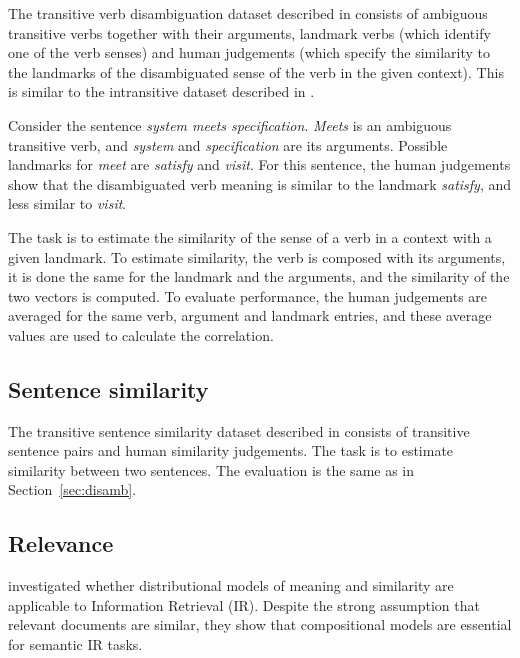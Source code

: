The transitive verb disambiguation dataset
described in  consists of ambiguous transitive verbs together with their arguments, landmark verbs (which identify one of the verb senses) and human judgements (which specify the similarity to the landmarks of the disambiguated sense of the verb in the given context). This is similar to the intransitive dataset described in .

Consider the sentence \textit{system meets specification}. \textit{Meets} is an ambiguous transitive verb, and \textit{system}
and \textit{specification} are its arguments. Possible landmarks for \emph{meet} are \textit{satisfy} and \textit{visit}. For this sentence, the human judgements show that the disambiguated verb meaning is similar to the landmark \textit{satisfy}, and less similar to \textit{visit}.

The task is to estimate the similarity of the sense of a verb in a context with a given landmark. To estimate similarity, the verb is composed with its arguments, it is done the same for the landmark and the arguments, and the similarity of the two vectors is computed. To evaluate performance, the human judgements are averaged for the same verb, argument and landmark entries, and these average values are used to calculate the correlation.

\subsection{Sentence similarity}
\label{sec:sentence-similarity}

The transitive sentence similarity dataset described in  consists of transitive sentence pairs and human similarity judgements. The task is to estimate similarity between two sentences. The evaluation is the same as in Section~\ref{sec:disamb}.

\subsection{Relevance}
\label{sec:relevance}

 investigated whether distributional
models of meaning and similarity are applicable to Information Retrieval (IR). Despite the strong assumption that relevant documents are similar, they show that compositional models are essential for semantic IR tasks.


